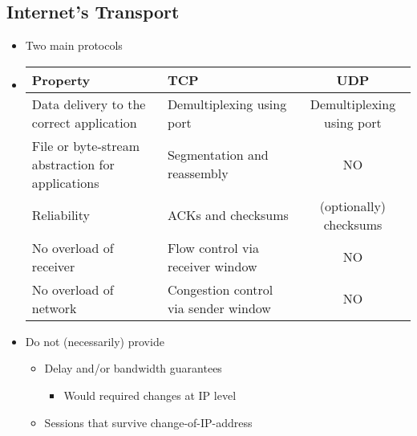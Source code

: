 \subsection{Internet's Transport}
\begin{itemize}
    \item Two main protocols
    \item
        \begin{tabular}{p{} | p{} | c}
            Property & TCP & UDP\\
            \hline
            Data delivery to the correct application & Demultiplexing using port & Demultiplexing using port\\
            \hline
            File or byte-stream abstraction for applications & Segmentation and reassembly & NO\\
            \hline
            Reliability & ACKs and checksums & (optionally) checksums\\
            \hline
            No overload of receiver & Flow control via receiver window & NO\\
            \hline
            No overload of network & Congestion control via sender window & NO
        \end{tabular}
    \item Do not (necessarily) provide
        \begin{itemize}
            \item Delay and/or bandwidth guarantees
                \begin{itemize}
                    \item Would required changes at IP level
                \end{itemize}
            \item Sessions that survive change-of-IP-address
        \end{itemize}
\end{itemize}

